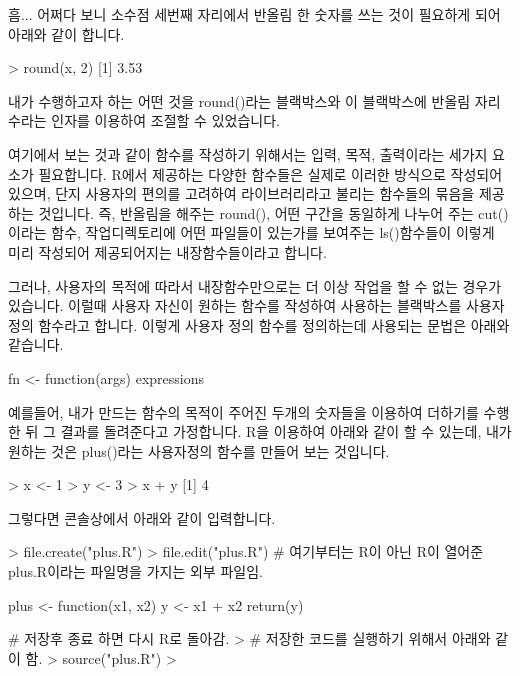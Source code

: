 흠... 어쩌다 보니 소수점 세번째 자리에서 반올림 한 숫자를 쓰는 것이 필요하게 되어 아래와 같이 합니다.

\begin{Schunk}
\begin{Soutput}
> round(x, 2)
[1] 3.53
\end{Soutput}
\end{Schunk}

내가 수행하고자 하는 어떤 것을 round()라는 블랙박스와 이 블랙박스에 반올림 자리수라는 인자를 이용하여 조절할 수 있었습니다. 

여기에서 보는 것과 같이 함수를 작성하기 위해서는 입력, 목적, 출력이라는 세가지 요소가 필요합니다. 
R에서 제공하는 다양한 함수들은 실제로 이러한 방식으로 작성되어 있으며, 단지 사용자의 편의를 고려하여 라이브러리라고 불리는 함수들의 묶음을 제공하는 것입니다. 
즉, 반올림을 해주는 round(), 어떤 구간을 동일하게 나누어 주는 cut()이라는 함수, 작업디렉토리에 어떤 파일들이 있는가를 보여주는 ls()함수들이 이렇게 미리 작성되어 제공되어지는 내장함수들이라고 합니다.

그러나, 사용자의 목적에 따라서 내장함수만으로는 더 이상 작업을 할 수 없는 경우가 있습니다.
이럴때 사용자 자신이 원하는 함수를 작성하여 사용하는 블랙박스를 사용자정의 함수라고 합니다.
이렇게 사용자 정의 함수를 정의하는데 사용되는 문법은 아래와 같습니다. 

\begin{Schunk}
\begin{Soutput}
fn <- function(args){
	expressions
}
\end{Soutput}
\end{Schunk}

예를들어, 내가 만드는 함수의 목적이 주어진 두개의 숫자들을 이용하여 더하기를 수행한 뒤 그 결과를 돌려준다고 가정합니다.
R을 이용하여 아래와 같이 할 수 있는데, 내가 원하는 것은 plus()라는 사용자정의 함수를 만들어 보는 것입니다. 

\begin{Schunk}
\begin{Soutput}
> x <- 1
> y <- 3
> x + y
[1] 4
\end{Soutput}
\end{Schunk}

그렇다면 콘솔상에서 아래와 같이 입력합니다. 

\begin{Schunk}
\begin{Soutput}
> file.create("plus.R")
> file.edit("plus.R")
# 여기부터는 R이 아닌 R이 열어준 plus.R이라는 파일명을 가지는 외부 파일임.

plus <- function(x1, x2){
	y <- x1 + x2
	return(y)
}

# 저장후 종료 하면 다시 R로 돌아감.
> # 저장한 코드를 실행하기 위해서 아래와 같이 함.
> source("plus.R")
>
\end{Soutput}
\end{Schunk}

